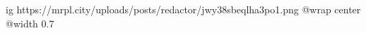  
 
 
 
 

\ifcmt
  ig https://mrpl.city/uploads/posts/redactor/jwy38sbeqlha3po1.png
  @wrap center
  @width 0.7
\fi
